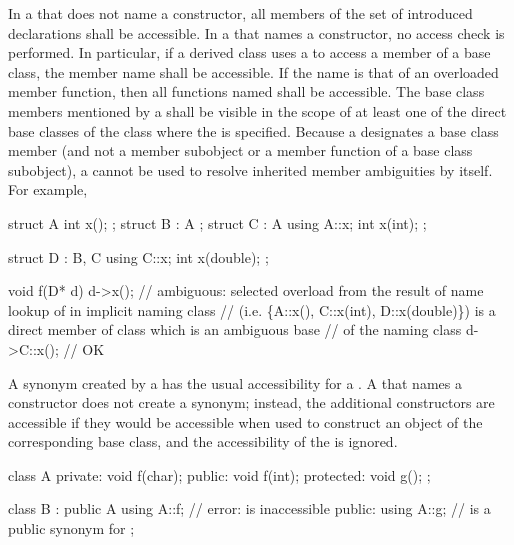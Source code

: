 \pnum
{}%
In a  that does not name a constructor,
all members of the set of introduced declarations shall be accessible.
In a  that names a constructor,
no access check is performed.
In particular, if a derived class uses a
 to access a member of a base class, the
member name shall be accessible. If the name is that of an overloaded
member function, then all functions named shall be accessible. The base
class members mentioned by a  shall be
visible in the scope of at least one of the direct base classes of the
class where the  is specified. \enternote
Because a  designates a base class member
(and not a member subobject or a member function of a base class
subobject), a  cannot be used to resolve
inherited member ambiguities by itself. For example,

\begin{codeblock}
struct A { int x(); };
struct B : A { };
struct C : A {
  using A::x;
  int x(int);
};

struct D : B, C {
  using C::x;
  int x(double);
};

void f(D* d) {
  d->x();    // ambiguous: selected overload  from the result of name lookup of  in implicit naming class 
             // (i.e. \{A::x(), C::x(int), D::x(double)\}) is a direct member of class  which is an ambiguous base 
             // of the naming class 
  d->C::x(); // OK
}
\end{codeblock}
\exitnote

\pnum
A synonym created by a  has the usual
accessibility for a .
A  that names a constructor does not
create a synonym; instead, the additional constructors
are accessible if they would be accessible
when used to construct an object of the corresponding base class,
and the accessibility of the  is ignored.
\enterexample

\begin{codeblock}
class A {
private:
    void f(char);
public:
    void f(int);
protected:
    void g();
};

class B : public A {
  using A::f;       // error:  is inaccessible
public:
  using A::g;       //  is a public synonym for 
};
\end{codeblock}
\exitexample

